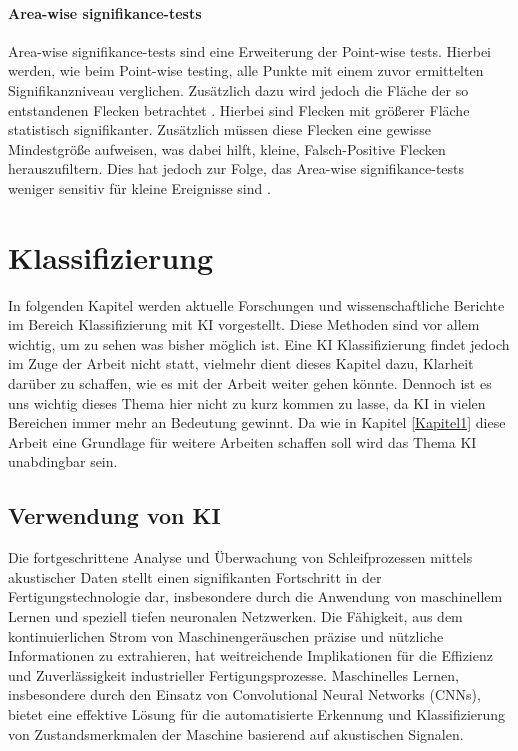 \paragraph{Area-wise signifikance-tests}

Area-wise signifikance-tests sind eine Erweiterung der Point-wise tests. Hierbei werden, wie beim Point-wise testing, alle Punkte mit einem zuvor ermittelten Signifikanzniveau verglichen. Zusätzlich dazu wird jedoch die Fläche der so entstandenen Flecken betrachtet \cite{Maraun2007}. Hierbei sind Flecken mit größerer Fläche statistisch signifikanter. Zusätzlich müssen diese Flecken eine gewisse Mindestgröße aufweisen, was dabei hilft, kleine, Falsch-Positive Flecken herauszufiltern. Dies hat jedoch zur Folge, das Area-wise signifikance-tests weniger sensitiv für kleine Ereignisse sind \cite{Schulte2016}. 

\section{Klassifizierung}

In folgenden Kapitel werden aktuelle Forschungen und wissenschaftliche Berichte im Bereich Klassifizierung mit KI vorgestellt. Diese Methoden sind vor allem wichtig, um zu sehen was bisher möglich ist. Eine KI Klassifizierung findet jedoch im Zuge der Arbeit nicht statt, vielmehr dient dieses Kapitel dazu, Klarheit darüber zu schaffen, wie es mit der Arbeit weiter gehen könnte. Dennoch ist es uns wichtig dieses Thema hier nicht zu kurz kommen zu lasse, da KI in vielen Bereichen immer mehr an Bedeutung gewinnt. Da wie in Kapitel \ref{Kapitel1} diese Arbeit eine Grundlage für weitere Arbeiten schaffen soll wird das Thema KI unabdingbar sein. 

\subsection{Verwendung von KI}
Die fortgeschrittene Analyse und Überwachung von Schleifprozessen mittels akustischer Daten stellt einen signifikanten Fortschritt in der Fertigungstechnologie dar, insbesondere durch die Anwendung von maschinellem Lernen und speziell tiefen neuronalen Netzwerken. Die Fähigkeit, aus dem kontinuierlichen Strom von Maschinengeräuschen präzise und nützliche Informationen zu extrahieren, hat weitreichende Implikationen für die Effizienz und Zuverlässigkeit industrieller Fertigungsprozesse. Maschinelles Lernen, insbesondere durch den Einsatz von Convolutional Neural Networks (CNNs), bietet eine effektive Lösung für die automatisierte Erkennung und Klassifizierung von Zustandsmerkmalen der Maschine basierend auf akustischen Signalen.

